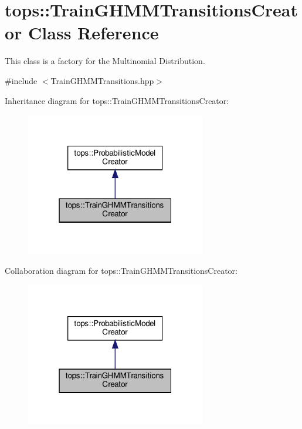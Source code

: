 \hypertarget{classtops_1_1TrainGHMMTransitionsCreator}{}\section{tops\+:\+:Train\+G\+H\+M\+M\+Transitions\+Creator Class Reference}
\label{classtops_1_1TrainGHMMTransitionsCreator}


This class is a factory for the Multinomial Distribution.  




{\ttfamily \#include $<$Train\+G\+H\+M\+M\+Transitions.\+hpp$>$}



Inheritance diagram for tops\+:\+:Train\+G\+H\+M\+M\+Transitions\+Creator\+:
\nopagebreak
\begin{figure}[H]
\begin{center}
\leavevmode
\includegraphics[width=223pt]{classtops_1_1TrainGHMMTransitionsCreator__inherit__graph}
\end{center}
\end{figure}


Collaboration diagram for tops\+:\+:Train\+G\+H\+M\+M\+Transitions\+Creator\+:
\nopagebreak
\begin{figure}[H]
\begin{center}
\leavevmode
\includegraphics[width=223pt]{classtops_1_1TrainGHMMTransitionsCreator__coll__graph}
\end{center}
\end{figure}
